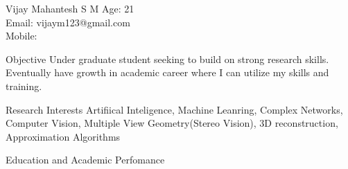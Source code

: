 \documentclass[a4paper,9pt]{article}
\begin{document}
\setmainfont
\header
{Vijay Mahantesh S M}
{}
{Age: 21\\
Email: vijaym123@gmail.com\\
Mobile: }

\begin{resumeblockNoTable}{Objective}
Under graduate student seeking to build on strong research skills. Eventually have growth in academic career where I can utilize my skills and training.
\\
\end{resumeblockNoTable}

\begin{resumeblockNoTable}{Research Interests}
Artifiical Inteligence, Machine Leanring, Complex Networks, Computer Vision, Multiple View Geometry(Stereo Vision), 3D reconstruction, Approximation Algorithms \\
\end{resumeblockNoTable}

\begin{resumeblock}{Education and Academic Perfomance}
 {}
\end{resumeblock}
\end{document}
